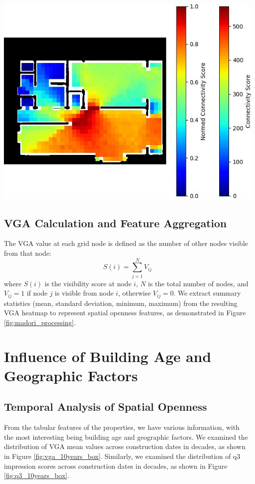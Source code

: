 \documentclass[11pt,a4paper]{article}
\begin{document}
\begin{multicols}{2}
\begin{flushleft}
    \includegraphics[width=0.7\columnwidth]{plots/exp_madori_semseg_vga.jpg}
    \label{fig:madori_processing}
\end{flushleft}
\subsection{VGA Calculation and Feature Aggregation}
The VGA value at each grid node is defined as the number of other nodes visible from that node:
\begin{equation}
\label{eq:vga_definition}
S(i) = \sum_{j=1}^{N} V_{ij}
\end{equation}
where $S(i)$ is the visibility score at node $i$, $N$ is the total number of nodes, and $V_{ij} = 1$ if 
node $j$ is visible from node $i$, otherwise $V_{ij} = 0$. We extract summary statistics (mean, standard deviation, minimum, maximum) from the resulting VGA heatmap to represent spatial openness features, as demonstrated in Figure \ref{fig:madori_processing}.


\section{Influence of Building Age and Geographic Factors}

\subsection{Temporal Analysis of Spatial Openness}
From the tabular features of the properties, we have various information, with the most interesting 
being building age and geographic factors. 
We examined the distribution of VGA mean values across construction dates in decades, as shown in 
Figure \ref{fig:vga_10years_box}.
Similarly, we examined the distribution of q3 impression scores across construction dates in decades, 
as shown in Figure \ref{fig:q3_10years_box}.


\end{multicols}
\end{document}
